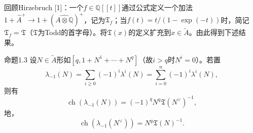 回顾Hirzebruch [1]：一个$f\in\mathbb Q[[t]]$通过公式定义一个加法$1+\widehat A^+\to1+(\widehat{A\otimes\mathbb Q})^+$，记为$\mathfrak T_f$；当$f(t)=t/(1-\exp(-t))$时，简记$\mathfrak T_f=\mathfrak T$（$\mathfrak T$为Todd的首字母）。将$\mathfrak T(x)$的定义扩充到$x\in\widetilde A$。由此得到下述结果。
\begin{SGAresult}{命题}{1.3}
设$N\in\widetilde A$形如$[q,1+N^1+\cdots+N^q]$（故$i>q$时$N^i=0$）。若置
\[\lambda_{-1}(N)=\sum_{i\geq0}(-1)^i\lambda^i(N)=\sum_{i=0}^{n}(-1)^i\lambda^i(N),\]
则有
\begin{equation}\operatorname{ch}(\lambda_{-1}(N))=(-1)^qN^q\mathfrak T(N^\vee)^{-1},\tag{1.30}\end{equation}
地，
\begin{equation}\operatorname{ch}(\lambda_{-1}(N^\vee))=N^q\mathfrak T(N)^{-1}.\tag{1.30 bis}\end{equation}
\end{SGAresult}

